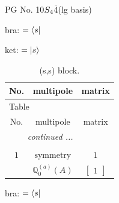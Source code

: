 \documentclass[fleqn,8pt,landscape]{jsarticle}
\begin{document}
\setcounter{MaxMatrixCols}{32}

\renewcommand{\tablename}{Table~}
\renewcommand{\figurename}{Figure~}
\begin{center}
\LARGE
PG No. 10\quad$S_{\rm 4}$\quad$\bar{4}$\quad[ tetragonal ] (lg basis)
\end{center}
bra: $=\bra{s}$

\noindent
ket: $=\ket{s}$
\renewcommand{\arraystretch}{1.6}
\begin{longtable}{ccc}
\caption{(s,s) block.}
 \\
 \hline \hline
No. & multipole & matrix \\ \hline \endfirsthead

\multicolumn{2}{l}{\tablename\ \thetable{}} \\
 \hline \hline
No. & multipole & matrix \\ \hline \endhead

 \hline \hline
\multicolumn{2}{r}{\footnotesize\it continued ...} \\ \endfoot

 \hline \hline
\multicolumn{2}{r}{} \\ \endlastfoot

$ 1 $ & $ \text{symmetry} $ & $ 1 $ \\
$  $ & $ \mathbb{Q}_{0}^{(a)}(A) $ & $ \begin{bmatrix} 1 \end{bmatrix} $ \\ \hline
\end{longtable}
bra: $=\bra{s}$
\end{document}
